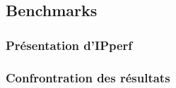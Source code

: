 \subsection{Benchmarks}

\subsubsection{Présentation d'IPperf}

\subsubsection{Confrontration des résultats}